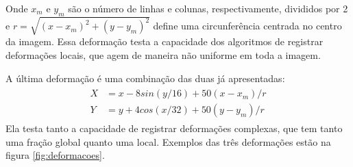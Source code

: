 Onde $x_m$ e $y_m$ são o número de linhas e colunas, respectivamente, divididos por 2 e $r = \sqrt{(x-x_m)^2 + (y-y_m)^2}$
define uma circunferência centrada no centro da imagem. Essa deformação testa a capacidade dos algoritmos de registrar
deformações locais, que agem de maneira não uniforme em toda a imagem.

	A última deformação é uma combinação das duas já apresentadas:
\begin{align} \label{math:composta}
\begin{split}
	X &= x-8sin(y/16) + 50(x-x_m)/r \\
	Y &= y+4cos(x/32) + 50(y-y_m)/r
\end{split} 
\end{align}
	Ela testa tanto a capacidade de registrar deformações complexas, que tem tanto uma fração global quanto uma local. 
Exemplos das três deformações estão na figura \ref{fig:deformacoes}.

